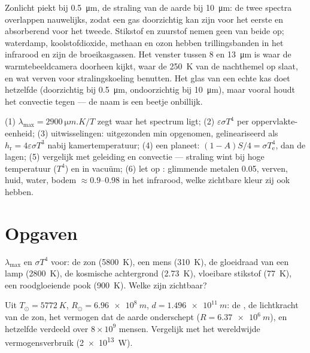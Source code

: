 \begin{remark}\label{rem:b2:thermal-radiation:selective}
Zonlicht piekt bij \qty{0.5}{\micro m}, de straling van de aarde bij
\qty{10}{\micro m}: de twee spectra overlappen nauwelijks, zodat een gas
doorzichtig kan zijn voor het eerste en absorberend voor het tweede. Stikstof en
zuurstof nemen geen van beide op; waterdamp, koolstofdioxide, methaan en ozon
hebben trillingsbanden in het infrarood en zijn de broeikasgassen. Het
venster tussen \qty{8}{} en \qty{13}{\micro m} is waar de warmtebeeldcamera
doorheen kijkt, waar de \qty{250}{K} van de nachthemel op slaat, en wat
verven voor stralingskoeling benutten. Het glas van een echte kas doet
hetzelfde (doorzichtig bij \qty{0.5}{\micro m}, ondoorzichtig bij
\qty{10}{\micro m}),
maar vooral houdt het convectie tegen --- de naam is een beetje onbillijk.
\end{remark}

\begin{method}[Stralingsschattingen]\label{meth:b2:thermal-radiation:method}
(1) $\lambda_{\max} = \qty{2900}{\micro m.K}/T$ zegt waar het spectrum
ligt; (2) $\varepsilon\sigma T^4$ per oppervlakte-eenheid; (3)
uitwisselingen: uitgezonden
min opgenomen, gelineariseerd als $h_{\text{r}} = 4\varepsilon\sigma T^3$ nabij
kamertemperatuur; (4) een planeet: $(1 - A)S/4 = \sigma T_{\text{e}}^4$, dan
de lagen; (5) vergelijk met geleiding en convectie --- straling
wint bij hoge temperatuur ($T^4$) en in vacuüm; (6) let op :
glimmende metalen \qty{0.05}{}, verven, huid, water, bodem $\approx 0.9$--$0.98$
in het infrarood, welke zichtbare kleur zij ook hebben.
\end{method}

\section{Opgaven}

\begin{exercise}[$\star$]\label{exo:b2:thermal-radiation:1}
$\lambda_{\max}$ en $\sigma T^4$ voor: de zon (\qty{5800}{K}), een mens
(\qty{310}{K}), de gloeidraad van een lamp (\qty{2800}{K}), de kosmische achtergrond
(\qty{2.73}{K}), vloeibare stikstof (\qty{77}{K}), een roodgloeiende pook
(\qty{900}{K}). Welke zijn zichtbaar?
\end{exercise}

\begin{exercise}[$\star$]\label{exo:b2:thermal-radiation:2}
Uit $T_\odot = \qty{5772}{K}$, $R_\odot = \qty{6.96e8}{m}$, $d = \qty{1.496e11}{m}$:
de , de lichtkracht van de zon, het vermogen dat de aarde
onderschept ($R = \qty{6.37e6}{m}$), en hetzelfde verdeeld over $8 \times 10^9$
mensen. Vergelijk met het wereldwijde vermogensverbruik (\qty{2e13}{W}).
\end{exercise}

